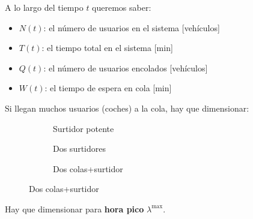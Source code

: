 \documentclass[xcolor={x11names}]{beamer}
\begin{document}
\begin{frame}{\secname}
    

    \begin{figure}
        
    \end{figure}
    A lo largo del tiempo $t$ queremos saber:

    \begin{itemize}
        \item $N(t)$: el número de usuarios
            en el sistema [vehículos]
        \item $T(t)$: el tiempo total en
            el sistema
            [min]
        \item $Q(t)$: el número de usuarios
            encolados [vehículos]
        \item $W(t)$: el tiempo de espera
            en cola [min]
    \end{itemize}
\end{frame}









\begin{frame}{\secname}
    Si llegan muchos usuarios (coches)
    a la cola, hay que dimensionar:


    \begin{figure}
     \centering
     \begin{subfigure}[b]{0.3\textwidth}
         \centering
         \resizebox{\textwidth}{!}{%
         }
         \caption{Surtidor potente}
     \end{subfigure}
     \hfill
     \begin{subfigure}[b]{0.3\textwidth}
         \centering
         \resizebox{\textwidth}{!}{%
         }
         \caption{Dos surtidores}
     \end{subfigure}
     \hfill
     \begin{subfigure}[b]{0.3\textwidth}
         \centering
         \resizebox{\textwidth}{!}{%
         }
         \caption{Dos colas+surtidor}
     \end{subfigure}
    \end{figure}

\end{frame}



\begin{frame}{\secname}
    Hay que dimensionar para \textbf{hora pico}
    $\lambda^{\max}$.

    \vfill

    \begin{figure}
        
    \end{figure}
\end{frame}
\end{document}
